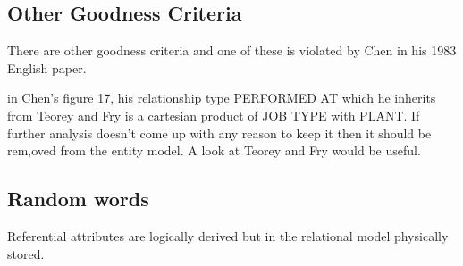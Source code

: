 \subsection*{Other Goodness Criteria}
\mynote
There are other goodness criteria and one of these is violated by Chen in his 1983 English paper.

in Chen's figure 17, his  relationship type PERFORMED AT which he inherits from Teorey and Fry
is a cartesian product of JOB TYPE with PLANT. 
If further analysis doesn't come up with any reason to keep it then it should be rem,oved from the entity model. A look at Teorey and Fry would be useful.

\subsection{Random words}
Referential attributes are logically derived but in the relational model physically stored.


